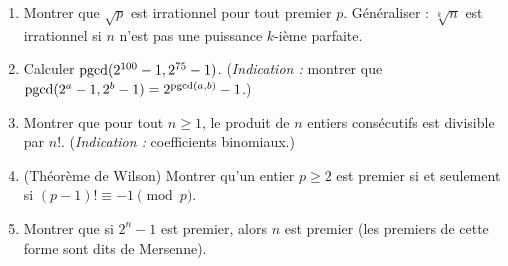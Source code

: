 \vspace{6pt}
\exolabel

\begin{mdframed}[style=exobar]
  \begin{enumerate}
    \item Montrer que $\sqrt{p}$ est irrationnel pour tout premier $p$.
          Généraliser : $\sqrt[k]{n}$ est irrationnel si $n$ n'est pas une
          puissance $k$-ième parfaite.

    \item Calculer $\operatorname{pgcd}(2^{100}-1, 2^{75}-1)$.
          (\textit{Indication :} montrer que $\operatorname{pgcd}(2^a-1, 2^b-1) = 2^{\operatorname{pgcd}(a,b)}-1$.)

    \item Montrer que pour tout $n \geq 1$, le produit de $n$ entiers consécutifs
          est divisible par $n!$. (\textit{Indication :} coefficients binomiaux.)

    \item (Théorème de Wilson) Montrer qu'un entier $p \geq 2$ est premier si et
          seulement si $(p-1)! \equiv -1 \pmod{p}$.

    \item Montrer que si $2^n - 1$ est premier, alors $n$ est premier
          (les premiers de cette forme sont dits de Mersenne).
  \end{enumerate}
\end{mdframed}

